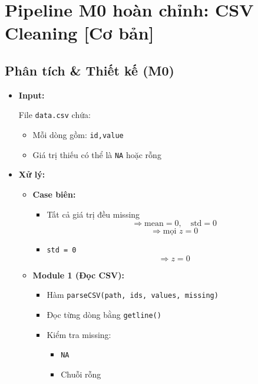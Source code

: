\section{Pipeline M0 hoàn chỉnh: CSV Cleaning [Cơ bản]}
\subsection{Phân tích \& Thiết kế (M0)}

\begin{itemize}

    \item \textbf{Input:}

    File \texttt{data.csv} chứa:
    
    \begin{itemize}
        \item Mỗi dòng gồm: \texttt{id,value}
        \item Giá trị thiếu có thể là \texttt{NA} hoặc rỗng
    \end{itemize}

    \item \textbf{Xử lý:}

    \begin{itemize}

        \item \textbf{Case biên:}

        \begin{itemize}
            \item Tất cả giá trị đều missing
            \[
                \Rightarrow \text{mean} = 0,\quad \text{std} = 0
            \]
            \[
                \Rightarrow \text{mọi } z = 0
            \]

            \item \texttt{std = 0}
            \[
                \Rightarrow z = 0
            \]
        \end{itemize}

        \item \textbf{Module 1 (Đọc CSV):}

        \begin{itemize}
            \item Hàm \texttt{parseCSV(path, ids, values, missing)}
            \item Đọc từng dòng bằng \texttt{getline()}
            \item Kiểm tra missing:
            \begin{itemize}
                \item \texttt{NA}
                \item Chuỗi rỗng
            \end{itemize}
        \end{itemize}


\end{itemize}
\end{itemize}
